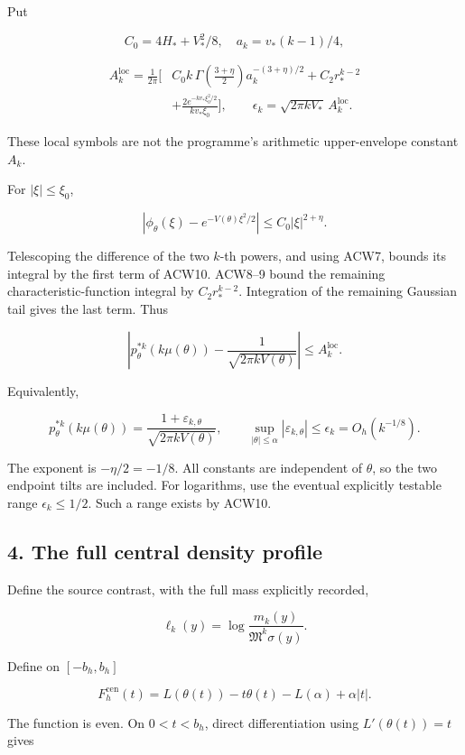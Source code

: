 Put

\[
C_0=4H_*+V_*^2/8,\quad a_k=v_*(k-1)/4,
\]

\[
\begin{aligned}
A_k^{\mathrm{loc}}=\frac1{2\pi}\bigg[
&C_0 k\,\Gamma\!\left(\frac{3+\eta}{2}\right)
 a_k^{-(3+\eta)/2}
+C_2 r_*^{k-2}\\
&+\frac{2e^{-kv_*\xi_0^2/2}}{kv_*\xi_0}
\bigg],\qquad
\epsilon_k=\sqrt{2\pi kV_*}\,A_k^{\mathrm{loc}}.
\end{aligned}
\tag{ACW10}
\]

These local symbols are not the programme's arithmetic upper-envelope constant \(A_k\).

For \(|\xi|\le\xi_0\),

\[
|\phi_\theta(\xi)-e^{-V(\theta)\xi^2/2}|
\le C_0|\xi|^{2+\eta}.
\]

Telescoping the difference of the two \(k\)-th powers, and using ACW7, bounds its integral by the first term of ACW10. ACW8--9 bound the remaining characteristic-function integral by \(C_2r_*^{k-2}\). Integration of the remaining Gaussian tail gives the last term. Thus

\[
\left|
p_\theta^{*k}(k\mu(\theta))
-\frac1{\sqrt{2\pi kV(\theta)}}
\right|\le A_k^{\mathrm{loc}}.
\]

Equivalently,

\[
\boxed{
p_\theta^{*k}(k\mu(\theta))
=\frac{1+\varepsilon_{k,\theta}}
{\sqrt{2\pi kV(\theta)}},
\qquad
\sup_{|\theta|\le\alpha}|\varepsilon_{k,\theta}|\le\epsilon_k
=O_h(k^{-1/8}).}
\tag{ACW11}
\]

The exponent is \(-\eta/2=-1/8\). All constants are independent of \(\theta\), so the two endpoint tilts are included. For logarithms, use the eventual explicitly testable range \(\epsilon_k\le1/2\). Such a range exists by ACW10.

\subsection{4. The full central density profile}\label{the-full-central-density-profile}

Define the source contrast, with the full mass explicitly recorded,

\[
\ell_k(y)=\log\frac{m_k(y)}{\mathfrak M^k\sigma(y)}.
\]

Define on \([-b_h,b_h]\)

\[
F_h^{\mathrm{cen}}(t)=
L(\theta(t))-t\theta(t)-L(\alpha)+\alpha|t|.
\tag{ACW12}
\]

The function is even. On \(0<t<b_h\), direct differentiation using \(L'(\theta(t))=t\) gives

